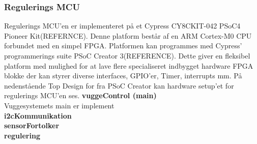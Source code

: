 \subsubsection{Regulerings MCU}
Regulerings MCU'en er implementeret på et Cypress CY8CKIT-042 PSoC4 Pioneer Kit(REFERNCE). Denne platform består af en ARM Cortex-M0 CPU forbundet med en simpel FPGA. Platformen kan programmes med Cypress' programmerings suite PSoC Creator 3(REFERENCE). Dette giver en fleksibel platform med mulighed for at lave flere specialiseret indbygget hardware FPGA blokke der kan styrer diverse interfaces, GPIO'er, Timer, interrupts mm. 
På nedenstående Top Design for fra PSoC Creator kan hardware setup'et for regulerings MCU'en ses.
\textbf{vuggeControl (main)} \\
Vuggesystemets main er implement \\
\textbf{i2cKommunikation} \\
\textbf{sensorFortolker} \\
\textbf{regulering} \\

